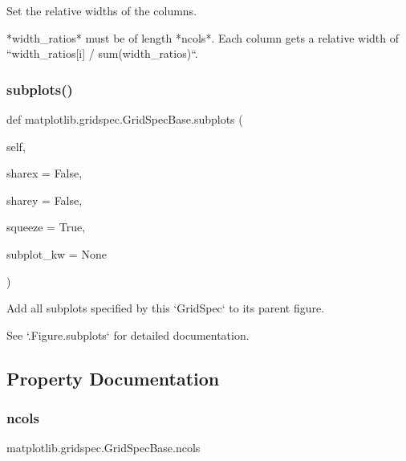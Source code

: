 \begin{DoxyVerb}Set the relative widths of the columns.

*width_ratios* must be of length *ncols*. Each column gets a relative
width of ``width_ratios[i] / sum(width_ratios)``.
\end{DoxyVerb}
 \mbox{\label{classmatplotlib_1_1gridspec_1_1GridSpecBase_a7d3bdfe4e0991646111adb0388ebc9c7}} 
\subsubsection{\texorpdfstring{subplots()}{subplots()}}
{\footnotesize\ttfamily def matplotlib.\+gridspec.\+Grid\+Spec\+Base.\+subplots (\begin{DoxyParamCaption}\item[{}]{self,  }\item[{}]{sharex = {\ttfamily False},  }\item[{}]{sharey = {\ttfamily False},  }\item[{}]{squeeze = {\ttfamily True},  }\item[{}]{subplot\+\_\+kw = {\ttfamily None} }\end{DoxyParamCaption})}

\begin{DoxyVerb}Add all subplots specified by this `GridSpec` to its parent figure.

See `.Figure.subplots` for detailed documentation.
\end{DoxyVerb}
 

\subsection{Property Documentation}
\mbox{\label{classmatplotlib_1_1gridspec_1_1GridSpecBase_ad86cfae5903f2bf4e2fc878fd39461f3}} 
\subsubsection{\texorpdfstring{ncols}{ncols}}
{\footnotesize\ttfamily matplotlib.\+gridspec.\+Grid\+Spec\+Base.\+ncols\hspace{0.3cm}{\ttfamily [static]}}

